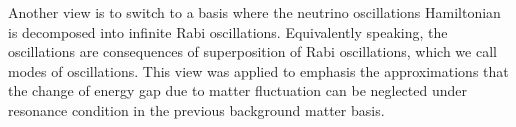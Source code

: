 Another view is to switch to a basis where the neutrino oscillations Hamiltonian is decomposed into infinite Rabi oscillations. Equivalently speaking, the oscillations are consequences of superposition of Rabi oscillations, which we call modes of oscillations. This view was applied to emphasis the approximations that the change of energy gap due to matter fluctuation can be neglected under resonance condition in the previous background matter basis.
















